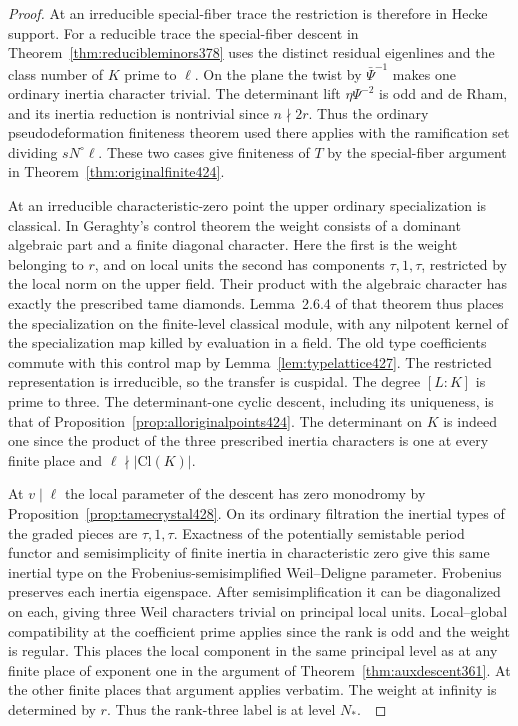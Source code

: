\documentclass[a4paper,11pt]{article}
\theoremstyle{definition}
\theoremstyle{remark}
\numberwithin{equation}{section}
\begin{document}
\begin{proof}
At an irreducible special-fiber trace the restriction is
therefore in Hecke support. For a reducible trace the
special-fiber descent in Theorem~\ref{thm:reducibleminors378}
uses the distinct residual eigenlines and the class number
of \(K\) prime to \(\ell\). On the plane the twist by
\(\bar\Psi^{-1}\) makes one ordinary inertia character trivial.
The determinant lift \(\eta\Psi^{-2}\) is odd and de Rham,
and its inertia reduction is nontrivial since \(n\nmid2r\).
Thus the ordinary pseudodeformation finiteness theorem used
there applies with the ramification set dividing \(sN^\circ\ell\).
These two cases give finiteness of \(T\) by the special-fiber
argument in Theorem~\ref{thm:originalfinite424}.~\cite{XI-VIII-VI-pan40}

At an irreducible characteristic-zero point the upper ordinary
specialization is classical. In Geraghty's control theorem the
weight consists of a dominant algebraic part and a finite
diagonal character. Here the first is the weight belonging
to \(r\), and on local units the second has components
\(\tau,1,\tau\), restricted by the local norm on the upper
field. Their product with the algebraic character has exactly
the prescribed tame diamonds. Lemma~2.6.4 of that theorem
thus places the specialization on the finite-level classical
module, with any nilpotent kernel of the specialization map
killed by evaluation in a field. The old type coefficients
commute with this control map by Lemma~\ref{lem:typelattice427}.
The restricted representation is irreducible, so the transfer
is cuspidal. The degree \([L:K]\) is prime to three. The
determinant-one cyclic descent, including its uniqueness, is
that of Proposition~\ref{prop:alloriginalpoints424}. The
determinant on \(K\) is indeed one since the product of the
three prescribed inertia characters is one at every finite
place and \(\ell\nmid|\mathrm{Cl}(K)|\).~\cite{XI-VIII-geraghty363,XI-VIII-I-ac123}

At \(v\mid\ell\) the local parameter of the descent has zero
monodromy by Proposition~\ref{prop:tamecrystal428}. On its
ordinary filtration the inertial types of the graded pieces
are \(\tau,1,\tau\). Exactness of the potentially semistable
period functor and semisimplicity of finite inertia in
characteristic zero give this same inertial type on the
Frobenius-semisimplified Weil--Deligne parameter. Frobenius
preserves each inertia eigenspace. After semisimplification
it can be diagonalized on each, giving three Weil characters
trivial on principal local units. Local--global compatibility
at the coefficient prime applies since the rank is odd and the
weight is regular. This places the local component in the
same principal level as at any finite place of exponent one
in the argument of Theorem~\ref{thm:auxdescent361}. At the
other finite places that argument applies verbatim. The
weight at infinity is determined by \(r\). Thus the rank-three
label is at level \(N_*\).~\cite{XI-VIII-lgp361,XI-VIII-V-shin}


\end{proof}
\end{document}
